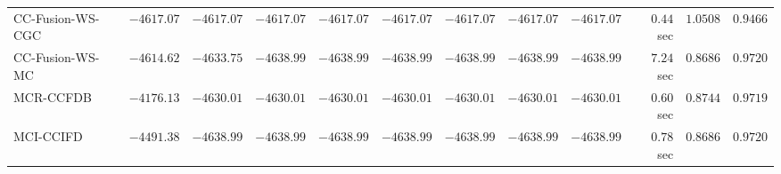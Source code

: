 \begin{table}[H]
\begin{tabular}{lrrrrrrrrrrr}
    CC-Fusion-WS-CGC & $     -4617.07$ & $     -4617.07$ & $     -4617.07$ & $     -4617.07$ & $     -4617.07$ & $     -4617.07$ & $     -4617.07$ & $     -4617.07$ & $         0.44$ sec    & $       1.0508$  & $       0.9466$ \\ 
     CC-Fusion-WS-MC & $     -4614.62$ & $     -4633.75$ & $     -4638.99$ & $     -4638.99$ & $     -4638.99$ & $     -4638.99$ & $     -4638.99$ & $     -4638.99$ & $         7.24$ sec    & $       0.8686$  & $       0.9720$ \\ 
\cmidrule{1-1} 
           MCR-CCFDB & $     -4176.13$ & $     -4630.01$ & $     -4630.01$ & $     -4630.01$ & $     -4630.01$ & $     -4630.01$ & $     -4630.01$ & $     -4630.01$ & $         0.60$ sec    & $       0.8744$  & $       0.9719$ \\ 
\cmidrule{1-1} 
           MCI-CCIFD & $     -4491.38$ & $     -4638.99$ & $     -4638.99$ & $     -4638.99$ & $     -4638.99$ & $     -4638.99$ & $     -4638.99$ & $     -4638.99$ & $         0.78$ sec    & $       0.8686$  & $       0.9720$ \\ 
\bottomrule
\end{tabular}
\end{table}

